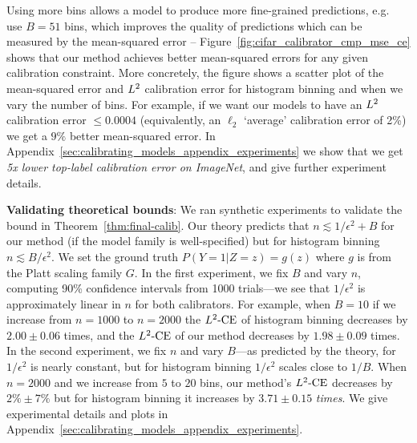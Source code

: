 Using more bins allows a model to produce more fine-grained predictions, e.g.~\cite{brocker2012empirical} use $B = 51$ bins, which improves the quality of predictions which can be measured by the mean-squared error -- Figure~\ref{fig:cifar_calibrator_cmp_mse_ce} shows that our method achieves better mean-squared errors for any given calibration constraint.
More concretely, the figure shows a scatter plot of the mean-squared error and $L^2{}$ calibration error for histogram binning and \ourcal{} when we vary the number of bins. For example, if we want our models to have an $L^2{}$ calibration error $\leq 0.0004$ (equivalently, an $\ell_2$ `average' calibration error of 2\%) we get a $9\%$ better mean-squared error. In Appendix~\ref{sec:calibrating_models_appendix_experiments} we show that we get \emph{5x lower top-label calibration error on ImageNet}, and give further experiment details.

\textbf{Validating theoretical bounds}: We ran synthetic experiments to validate the bound in Theorem~\ref{thm:final-calib}. Our theory predicts that $n \lesssim 1/\epsilon^2 + B$ for our method (if the model family is well-specified) but for histogram binning $n \lesssim B/\epsilon^2$. We set the ground truth $P(Y = 1 | Z=z) = g(z)$ where $g$ is from the Platt scaling family $G$. In the first experiment, we fix $B$ and vary $n$, computing 90\% confidence intervals from 1000 trials---we see that $1/\epsilon^2$ is approximately linear in $n$ for both calibrators. For example, when $B=10$ if we increase from $n=1000$ to $n=2000$ the $L^2\textup{-CE}$ of histogram binning decreases by $2.00 \pm 0.06$ times, and the $L^2\textup{-CE}$ of our method decreases by $1.98 \pm 0.09$ times. In the second experiment, we fix $n$ and vary $B$---as predicted by the theory, for \ourcal{} $1/\epsilon^2$ is nearly constant, but for histogram binning $1/\epsilon^2$ scales close to $1/B$. When $n = 2000$ and we increase from $5$ to $20$ bins, our method's $L^2\textup{-CE}$ decreases by $2\% \pm 7\%$ but for histogram binning it increases by $3.71 \pm 0.15$ \emph{times}.
We give experimental details and plots in Appendix~\ref{sec:calibrating_models_appendix_experiments}.

